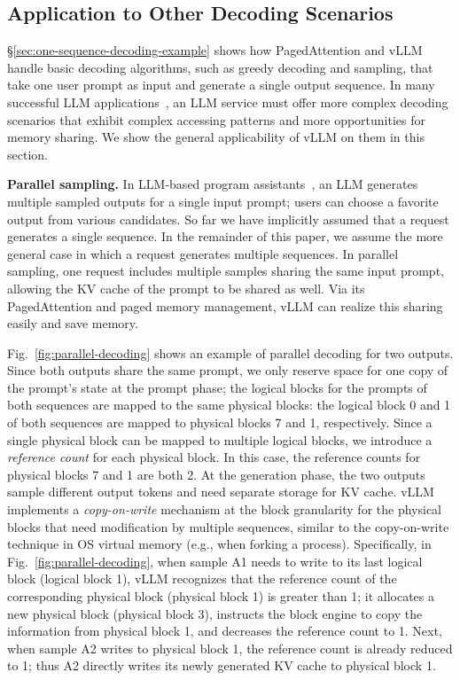 \documentclass[sigplan,10pt]{acmart}
\newcommand{\tech}[0]{PagedAttention\xspace}
\newcommand{\sys}[0]{vLLM\xspace}
\newcommand{\heading}[1]{\vspace{4pt}\noindent\textbf{#1}}
\begin{document}
\subsection{Application to Other Decoding Scenarios}
\label{sec:decoding-scenerios}

\S\ref{sec:one-sequence-decoding-example} shows how \tech and \sys handle basic decoding algorithms, such as greedy decoding and sampling, that take one user prompt as input and generate a single output sequence. In many successful LLM applications~\cite{copilot, openaiapi}, an LLM service must offer more complex decoding scenarios that exhibit complex accessing patterns and more opportunities for memory sharing. We show the general applicability of \sys on them in this section. 

\heading{Parallel sampling.} 
In LLM-based program assistants~\cite{chen2021evaluating, copilot}, an LLM generates multiple sampled outputs for a single input prompt; users can choose a favorite output from various candidates. 
So far we have implicitly assumed that a request generates a single sequence. In the remainder of this paper, we assume the more general case in which a request generates multiple sequences.
In parallel sampling, one request includes multiple samples sharing the same input prompt, allowing the KV cache of the prompt to be shared as well. Via its \tech and paged memory management, \sys can realize this sharing easily and save memory. 

Fig.~\ref{fig:parallel-decoding} shows an example of parallel decoding for two outputs. 
Since both outputs share the same prompt, we only reserve space for one copy of the prompt's state at the prompt phase; the logical blocks for the prompts of both sequences are mapped to the same physical blocks: the logical block 0 and 1 of both sequences are mapped to physical blocks 7 and 1, respectively. 
Since a single physical block can be mapped to multiple logical blocks, we introduce a \emph{reference count} for each physical block. In this case, the reference counts for physical blocks 7 and 1 are both 2. At the generation phase, the two outputs sample different output tokens and need separate storage for KV cache. 
\sys implements a \emph{copy-on-write} mechanism at the block granularity for the physical blocks that need modification by multiple sequences, similar to the copy-on-write technique in OS virtual memory (e.g., when forking a process).
Specifically, in Fig.~\ref{fig:parallel-decoding}, when sample A1 needs to write to its last logical block (logical block 1), \sys recognizes that the reference count of the corresponding physical block (physical block 1) is greater than 1; it allocates a new physical block (physical block 3), instructs the block engine to copy the information from physical block 1, and decreases the reference count to 1. Next, when sample A2 writes to physical block 1, the reference count is already reduced to 1; thus A2 directly writes its newly generated KV cache to physical block 1. 
\end{document}
